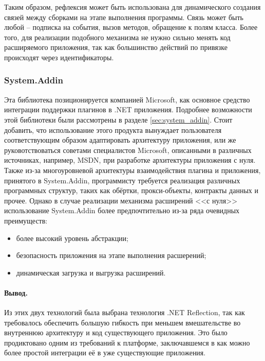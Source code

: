 Таким образом, рефлексия может быть использована для динамического создания связей между сборками на этапе выполнения программы. Связь может быть любой – подписка на события, вызов методов, обращение к полям класса. Более того, для реализации подобного механизма не нужно сильно менять код расширяемого приложения, так как большинство действий по привязке происходят через идентификаторы.

\subsubsection{System.Addin}

Эта библиотека позиционируется компанией Microsoft, как основное средство интеграции поддержки плагинов в .NET приложения. Подробнее возможности этой библиотеки были рассмотрены в разделе \ref{sec:system_addin}. Стоит добавить, что использование этого продукта вынуждает пользователя соответствующим образом адаптировать архитектуру приложения, или же руковотствоваться советами специалистов Microsoft, описанными в различных источниках, например, MSDN, при разработке архитектуры приложения с нуля. Также из-за многоуровневой архитектуры взаимодействия плагина и приложения, принятого в System.Addin, программисту требуется реализация различных программных структур, таких как обёртки, прокси-объекты, контракты данных и прочее. Однако в случае реализации механизма расширений <<с нуля>> использование System.Addin более предпочтительно из-за ряда очевидных преимуществ:

\begin{itemize}
  \item более высокий уровень абстракции;
  \item безопасность приложения на этапе выполнения расшерений;
  \item динамическая загрузка и выгрузка расширений.
\end{itemize}

\paragraph{Вывод.}

Из этих двух технологий была выбрана технология .NET Reflection, так как требовалось обеспечить большую гибкость при меньшем вмешательстве во внутреннюю архитектуру и код существующего приложения. Это было продиктовано одним из требований к платформе, заключавшемся в как можно более простой интеграции её в уже существующие приложения.

